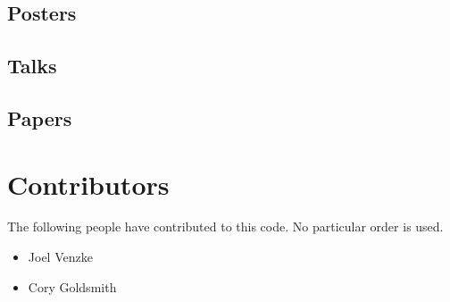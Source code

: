 \documentclass{article}
\begin{document}
\subsection{Posters} %
\label{sub:posters}

\subsection{Talks} %
\label{sub:talks}

\subsection{Papers} %
\label{sub:papers}

\section{Contributors} %
\label{sec:contributors}
The following people have contributed to this code. No particular order is used.
\begin{itemize}
  \item Joel Venzke
  \item Cory Goldsmith
\end{itemize}
\end{document}
